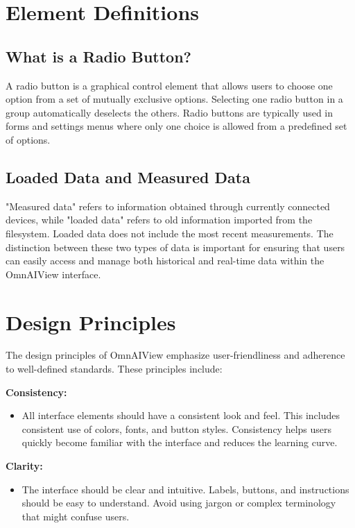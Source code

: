 \documentclass[]{scrreprt}
\begin{document}
\section{Element Definitions}

\subsection{What is a Radio Button?} \label{cap:RadioButton}

A radio button is a graphical control element that allows users to choose one option from a set of mutually exclusive options. Selecting one radio button in a group automatically deselects the others. Radio buttons are typically used in forms and settings menus where only one choice is allowed from a predefined set of options.

\subsection{Loaded Data and Measured Data} \label{cap:loadedData}

"Measured data" refers to information obtained through currently connected devices, while "loaded data" refers to old information imported from the filesystem. Loaded data does not include the most recent measurements. The distinction between these two types of data is important for ensuring that users can easily access and manage both historical and real-time data within the OmnAIView interface.

\section{Design Principles} \label{cap:Designprinciples}

The design principles of OmnAIView emphasize user-friendliness and adherence to well-defined standards. These principles include:

\textbf{Consistency:}
\begin{itemize}
    \item All interface elements should have a consistent look and feel. This includes consistent use of colors, fonts, and button styles. Consistency helps users quickly become familiar with the interface and reduces the learning curve.
\end{itemize}

\textbf{Clarity:}
\begin{itemize}
    \item The interface should be clear and intuitive. Labels, buttons, and instructions should be easy to understand. Avoid using jargon or complex terminology that might confuse users.
\end{itemize}
\end{document}

